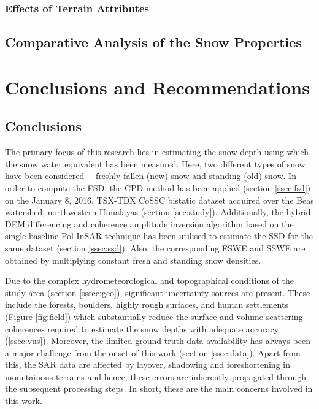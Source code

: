 \documentclass[review]{elsarticle}
\numberwithin{equation}{section}
\numberwithin{figure}{section}
\numberwithin{table}{section}
\begin{document}
\subsubsection{Effects of Terrain Attributes}
\label{sssec:terrain}
\subsection{Comparative Analysis of the Snow Properties}
\label{ssec:snow}

\section{Conclusions and Recommendations}
\label{sec:conc}
\subsection{Conclusions}

The primary focus of this research lies in estimating the snow depth using which the snow water equivalent has been measured. Here, two different types of snow have been considered— freshly fallen (new) snow and standing (old) snow. In order to compute the FSD, the CPD method has been applied (section \ref{ssec:fsd}) on the January 8, 2016, TSX-TDX CoSSC bistatic dataset acquired over the Beas watershed, northwestern Himalayas (section \ref{sec:study}). Additionally, the hybrid DEM differencing and coherence amplitude inversion algorithm based on the single-baseline Pol-InSAR technique has been utilised to estimate the SSD for the same dataset (section \ref{ssec:ssd}). Also, the corresponding FSWE and SSWE are
obtained by multiplying constant fresh and standing snow densities.

Due to the complex hydrometeorological and topographical conditions of the study area (section \ref{sssec:geo}), significant uncertainty sources are present. These include the forests, boulders, highly rough surfaces, and human settlements (Figure \ref{fig:field}) which substantially reduce the surface and volume scattering coherences required to estimate the snow depths with adequate accuracy (\ref{ssec:vus}). Moreover, the limited ground-truth data availability has always been a major challenge from the onset of this work (section \ref{ssec:data}). Apart from this, the SAR data are affected by layover, shadowing and foreshortening in mountainous terrains and hence, these errors are inherently propagated through the subsequent processing steps. In short, these are the main concerns involved in this work.
\end{document}
